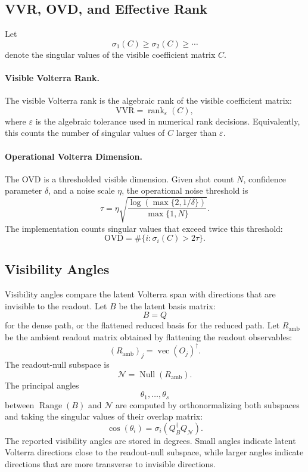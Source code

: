 \documentclass[11pt]{article}
\newcommand{\rank}{\operatorname{rank}}
\newcommand{\Null}{\operatorname{Null}}
\newcommand{\Range}{\operatorname{Range}}
\begin{document}
\subsection{VVR, OVD, and Effective Rank}

Let
\[
    \sigma_1(C)\ge \sigma_2(C)\ge \cdots
\]
denote the singular values of the visible coefficient matrix $C$.

\paragraph{Visible Volterra Rank.}
The visible Volterra rank is the algebraic rank of the visible coefficient
matrix:
\[
    \mathrm{VVR}
    =
    \rank_{\varepsilon}(C),
\]
where $\varepsilon$ is the algebraic tolerance used in numerical rank
decisions.  Equivalently, this counts the number of singular values of $C$
larger than $\varepsilon$.

\paragraph{Operational Volterra Dimension.}
The OVD is a thresholded visible dimension.  Given shot count $N$, confidence
parameter $\delta$, and a noise scale $\eta$, the operational noise threshold is
\[
    \tau
    =
    \eta
    \sqrt{\frac{\log(\max\{2,1/\delta\})}{\max\{1,N\}}}.
\]
The implementation counts singular values that exceed twice this threshold:
\[
    \mathrm{OVD}
    =
    \#\{i : \sigma_i(C) > 2\tau\}.
\]

\subsection{Visibility Angles}

Visibility angles compare the latent Volterra span with directions that are
invisible to the readout.  Let $B$ be the latent basis matrix:
\[
    B = Q
\]
for the dense path, or the flattened reduced basis for the reduced path.  Let
$R_{\mathrm{amb}}$ be the ambient readout matrix obtained by flattening the
readout observables:
\[
    (R_{\mathrm{amb}})_j = \operatorname{vec}(O_j)^\dagger.
\]
The readout-null subspace is
\[
    \mathcal{N} = \Null(R_{\mathrm{amb}}).
\]
The principal angles
\[
    \theta_1,\ldots,\theta_s
\]
between $\Range(B)$ and $\mathcal{N}$ are computed by orthonormalizing both
subspaces and taking the singular values of their overlap matrix:
\[
    \cos(\theta_i)
    =
    \sigma_i(Q_B^\dagger Q_{\mathcal{N}}).
\]
The reported visibility angles are stored in degrees.  Small angles indicate
latent Volterra directions close to the readout-null subspace, while larger
angles indicate directions that are more transverse to invisible directions.
\end{document}
